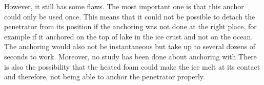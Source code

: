 However, it still has some flaws. The most important one is that this anchor could only be used once. This means that it could not be possible to detach the penetrator from its position if the anchoring was not done at the right place, for example if it anchored on the top of lake in the ice crust and not on the ocean. The anchoring would also not be instantaneous but take up to several dozens of seconds to work.
Moreover, no study has been done about anchoring with There is also the possibility that the heated foam could make the ice melt at its contact and therefore, not being able to anchor the penetrator properly.


